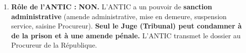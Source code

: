 \documentclass[11pt]{article}
\begin{document}
\begin{corrige}
\begin{enumerate}
\begin{itemize}
                  \item \textbf{Peine prison :} Possible mais exceptionnelle. Max = 5 ans / 2 = \textbf{2,5 ans}.
                  \item \textbf{Amendes :} Maintenues mais TIG ou paiement parents.
              \end{itemize}
        \item \textbf{Rôle de l'ANTIC :} \textbf{NON.} L'ANTIC a un pouvoir de \textbf{sanction administrative} (amende administrative, mise en demeure, suspension service, saisine Procureur). \textbf{Seul le Juge (Tribunal) peut condamner à de la prison et à une amende pénale.} L'ANTIC transmet le dossier au Procureur de la République.
    \end{enumerate}
\end{corrige}
\end{document}
